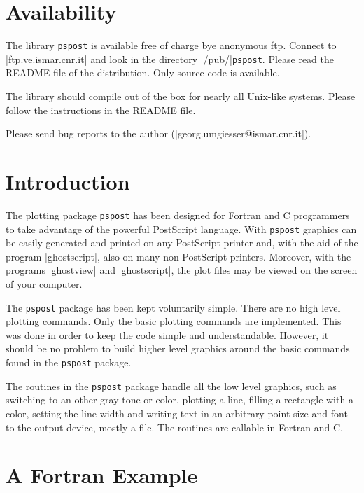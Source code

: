 \documentclass{article}
\newcommand{\psp}{{\tt pspost}}
\begin{document}
\section*{Availability}


The library \psp{} is available free of charge bye anonymous ftp.
Connect to
|ftp.ve.ismar.cnr.it| and look in the directory |/pub/|\psp{}.
Please read the README file of the distribution. Only source code
is available.

The library should compile out of the box for nearly all Unix-like
systems. Please follow the instructions in the README file.

Please send bug reports to the author (|georg.umgiesser@ismar.cnr.it|).


\newpage




\section{Introduction}


The plotting package \psp{} has been designed for Fortran and C
programmers to take advantage of the powerful PostScript language. With
\psp{} graphics can be easily generated and printed on any PostScript
printer and, with the aid of the program |ghostscript|, also on many
non PostScript printers. Moreover, with the programs |ghostview|
and |ghostscript|, the plot files may be viewed on the screen of your 
computer.

The \psp{} package has been kept voluntarily simple. There are no high
level plotting commands. Only the basic plotting commands are
implemented.  This was done in order to keep the code simple and
understandable.  However, it should be no problem to build higher level
graphics around the basic commands found in the \psp{} package.

The routines in the \psp{} package handle all the low level graphics,
such as switching to an other gray tone or color, plotting a line,
filling a rectangle with a color, setting the line width and writing
text in an arbitrary point size and font to the output device, mostly a
file. The routines are callable in Fortran and C.


\section{A Fortran Example}
\end{document}
